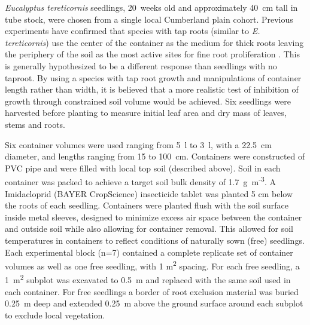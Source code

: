 \documentclass[a4paper]{article}\usepackage[]{graphicx}\usepackage[]{color}
\begin{document}
\textit{Eucalyptus tereticornis} seedlings, 20~weeks old and approximately 40~cm tall in tube stock, were chosen from a single local Cumberland plain cohort. Previous experiments have confirmed that species with tap roots (similar to \textit{E. tereticornis}) use the center of the container as the medium for thick roots leaving the periphery of the soil as the most active sites for fine root proliferation \citep{biran1980a,biran1980b}. This is generally hypothesized to be a different response than seedlings with no taproot. By using a species with tap root growth and manipulations of container length rather than width, it is believed that a more realistic test of inhibition of growth through constrained soil volume would be achieved. Six seedlings were harvested before planting to measure initial leaf area and dry mass of leaves, stems and roots.

Six container volumes were used ranging from 5~l to 3~l, with a 22.5~cm diameter, and lengths ranging from 15 to 100~cm. Containers were constructed of PVC pipe and were filled with local top soil (described above). Soil in each container was packed to achieve a target soil bulk density of 1.7~g~m\textsuperscript{-3}. A Imidacloprid (BAYER CropScience) insecticide tablet was planted 5 cm below the roots of each seedling. Containers were planted flush with the soil surface inside metal sleeves, designed to minimize excess air space between the container and outside soil while also allowing for container removal. This allowed for soil temperatures in containers to reflect conditions of naturally sown (free) seedlings. Each experimental block (n=7) contained a complete replicate set of container volumes as well as one free seedling, with 1 m\textsuperscript{2} spacing. For each free seedling, a 1~m\textsuperscript{2} subplot was excavated to 0.5~m and replaced with the same soil used in each container. For free seedlings a border of root exclusion material was buried 0.25~m deep and extended 0.25~m above the ground surface around each subplot to exclude local vegetation.
\end{document}

